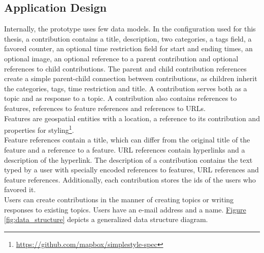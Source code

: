

\subsection{Application Design} %
\label{sub:design}

Internally, the prototype uses few data models. In the configuration used for this thesis, a contribution contains a title, description, two categories, a tags field, a favored counter, an optional time restriction field for start and ending times, an optional image, an optional reference to a parent contribution and optional references to child contributions. The parent and child contribution references create a simple parent-child connection between contributions, as children inherit the categories, tags, time restriction and title. A contribution serves both as a topic and as response to a topic. A contribution also contains references to features, references to feature references and references to URLs.\\
Features are geospatial entities with a location, a reference to its contribution and properties for styling\footnote{\url{https://github.com/mapbox/simplestyle-spec}}.\\
Feature references contain a title, which can differ from the original title of the feature and a reference to a feature. URL references contain hyperlinks and a description of the hyperlink. The description of a contribution contains the text typed by a user with specially encoded references to features, URL references and feature references. Additionally, each contribution stores the ids of the users who favored it.\\
Users can create contributions in the manner of creating topics or writing responses to existing topics. Users have an e-mail address and a name. \hyperref[fig:data_structure]{Figure \ref{fig:data_structure}} depicts a generalized data structure diagram.

